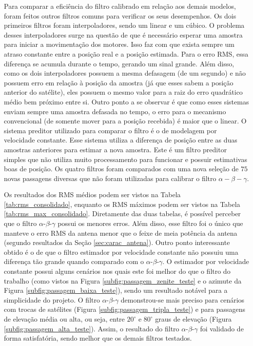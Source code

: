 Para comparar a eficiência do filtro calibrado em relação aos demais modelos, foram feitos outros filtros comuns para verificar os seus desempenhos.
Os dois primeiros filtros foram interpoladores, sendo um linear e um cúbico.
O problema desses interpoladores surge na questão de que é necessário esperar uma amostra para iniciar a movimentação dos motores.
Isso faz com que exista sempre um atraso constante entre a posição real e a posição estimada. Para o erro RMS, essa diferença se acumula durante o tempo, gerando um sinal grande.
Além disso, como os dois interpoladores possuem a mesma defasagem (de um segundo) e não possuem erro em relação à posição da amostra (já que esses sabem a posição anterior do satélite), eles possuem o mesmo valor para a raiz do erro quadrático médio bem próximo entre si.
Outro ponto a se observar é que como esses sistemas enviam sempre uma amostra defasada no tempo, o erro para o mecanismo convencional (de somente mover para a posição recebida) é maior que o linear.
O sistema preditor utilizado para comparar o filtro é o de modelagem por velocidade constante. Esse sistema utiliza a diferença de posição entre as duas amostras anteriores para estimar a nova amostra.
Este é um filtro preditor simples que não utiliza muito processamento para funcionar e possuir estimativas boas de posição. Os quatro filtros foram comparados com uma nova seleção de $75$ novas passagens diversas que não foram utilizadas para calibrar o filtro $\alpha-\beta-\gamma$.

Os resultados dos RMS médios podem ser vistos na Tabela \ref{tab:rms_consolidado}, enquanto os RMS máximos podem ser vistos na Tabela \ref{tab:rms_max_consolidado}.
Diretamente das duas tabelas, é possível perceber que o filtro $\alpha$-$\beta$-$\gamma$ possui os menores erros.
Além disso, esse filtro foi o único que manteve o erro RMS da antena menor que o feixe de meia potência da antena (segundo resultados da Seção \ref{sec:carac_antena}).
Outro ponto interessante obtido é o de que o filtro estimador por velocidade constante não possuiu uma diferença tão grande quando comparado com o $\alpha$-$\beta$-$\gamma$.
O estimador por velocidade constante possui alguns cenários nos quais este foi melhor do que o filtro do trabalho (como vistos na Figura \ref{subfig:passagem_zenite_teste} e o azimute da Figura \ref{subfig:passagem_baixa_teste}), sendo um resultado notável para a simplicidade do projeto.
O filtro $\alpha$-$\beta$-$\gamma$ demonstrou-se mais preciso para cenários com trocas de satélites (Figura \ref{subfig:passagem_tripla_teste}) e para passagens de elevação média ou alta, ou seja, entre $20^{\circ}$ e $80^{\circ}$ graus de elevação (Figura \ref{subfig:passagem_alta_teste}).
Assim, o resultado do filtro $\alpha$-$\beta$-$\gamma$ foi validado de forma satisfatória, sendo melhor que os demais filtros testados.

